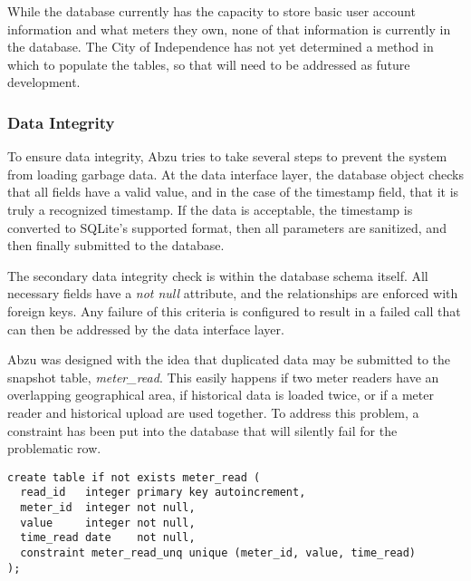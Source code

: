 \documentclass[journal]{IEEEtran}
\begin{document}
While the database currently has the capacity to store basic user account information and what meters they own, none of that information is currently in the database. The City of Independence has not yet determined a method in which to populate the tables, so that will need to be addressed as future development.

\subsubsection{Data Integrity}
To ensure data integrity, Abzu tries to take several steps to prevent the system from loading garbage data. At the data interface layer, the database object checks that all fields have a valid value, and in the case of the timestamp field, that it is truly a recognized timestamp. If the data is acceptable, the timestamp is converted to SQLite's supported format, then all parameters are sanitized, and then finally submitted to the database.

The secondary data integrity check is within the database schema itself. All necessary fields have a \textit{not null} attribute, and the relationships are enforced with foreign keys. Any failure of this criteria is configured to result in a failed call that can then be addressed by the data interface layer.

Abzu was designed with the idea that duplicated data may be submitted to the snapshot table, \textit{meter\_read}. This easily happens if two meter readers have an overlapping geographical area, if historical data is loaded twice, or if a meter reader and historical upload are used together. To address this problem, a constraint has been put into the database that will silently fail for the problematic row.

\begin{lstlisting}
create table if not exists meter_read (
  read_id   integer primary key autoincrement,
  meter_id  integer not null,
  value     integer not null,
  time_read date    not null,
  constraint meter_read_unq unique (meter_id, value, time_read)
);
\end{lstlisting}

\end{document}
